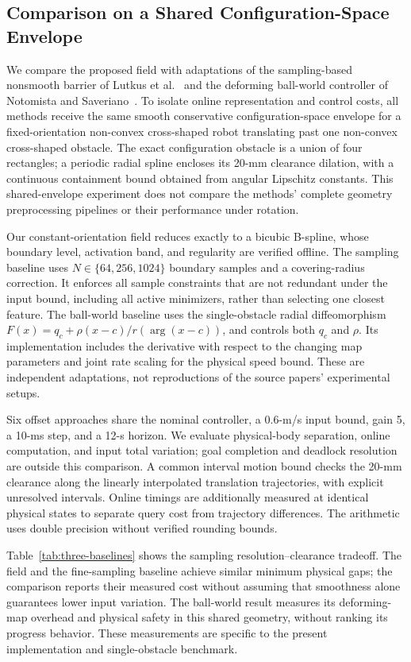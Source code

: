 \subsection{Comparison on a Shared Configuration-Space Envelope}
\label{sec:three-baselines}
We compare the proposed field with adaptations of the sampling-based nonsmooth
barrier of Lutkus et al.~\cite{lutkus2025sampling} and the deforming ball-world
controller of Notomista and Saveriano~\cite{notomista2021nonconvex}.
To isolate online representation and control costs, all methods receive the same
smooth conservative configuration-space envelope for a fixed-orientation
non-convex cross-shaped robot translating past one non-convex cross-shaped
obstacle. The exact configuration obstacle is a union of four rectangles; a
periodic radial spline encloses its 20-mm clearance dilation, with a continuous
containment bound obtained from angular Lipschitz constants.
This shared-envelope experiment does not compare the methods' complete geometry
preprocessing pipelines or their performance under rotation.

Our constant-orientation field reduces exactly to a bicubic B-spline, whose
boundary level, activation band, and regularity are verified offline.
The sampling baseline uses $N\in\{64,256,1024\}$ boundary samples and a
covering-radius correction. It enforces all sample constraints that are not
redundant under the input bound, including all active minimizers, rather than
selecting one closest feature. The ball-world baseline uses the single-obstacle
radial diffeomorphism $F(x)=q_c+\rho(x-c)/r(\arg(x-c))$, and controls both
$q_c$ and $\rho$. Its implementation includes the derivative with respect to
the changing map parameters and joint rate scaling for the physical speed
bound. These are independent adaptations, not reproductions of the source
papers' experimental setups.

Six offset approaches share the nominal controller, a 0.6-m/s input bound,
gain 5, a 10-ms step, and a 12-s horizon. We evaluate physical-body separation,
online computation, and input total variation; goal completion and deadlock
resolution are outside this comparison. A common interval motion bound checks
the 20-mm clearance along the linearly interpolated translation trajectories,
with explicit unresolved intervals. Online timings are additionally measured
at identical physical states to separate query cost from trajectory differences.
The arithmetic uses double precision without verified rounding bounds.



Table~\ref{tab:three-baselines} shows the sampling resolution--clearance tradeoff.
The field and the fine-sampling baseline achieve similar minimum physical gaps;
the comparison reports their measured cost without assuming that smoothness
alone guarantees lower input variation. The ball-world result measures its
deforming-map overhead and physical safety in this shared geometry, without
ranking its progress behavior. These measurements are specific to the present
implementation and single-obstacle benchmark.
